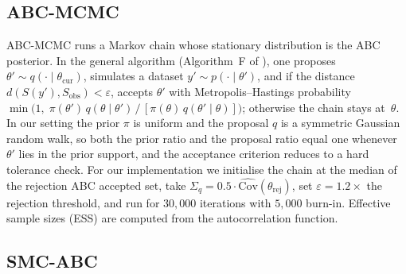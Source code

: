 \documentclass[11pt]{article}
\begin{document}
\subsection{ABC-MCMC}

ABC-MCMC \citep{marjoram2003markov} runs a Markov chain whose stationary distribution is the ABC posterior. In the general algorithm (Algorithm~F of \citeauthor{marjoram2003markov}), one proposes $\theta' \sim q(\cdot \mid \theta_{\text{cur}})$, simulates a dataset $y' \sim p(\cdot \mid \theta')$, and if the distance $d(S(y'), S_{\text{obs}}) < \varepsilon$, accepts $\theta'$ with Metropolis--Hastings probability $\min\bigl(1,\; \pi(\theta')\,q(\theta \mid \theta')\,/\,[\pi(\theta)\,q(\theta' \mid \theta)]\bigr)$; otherwise the chain stays at~$\theta$. In our setting the prior $\pi$ is uniform and the proposal $q$ is a symmetric Gaussian random walk, so both the prior ratio and the proposal ratio equal one whenever $\theta'$ lies in the prior support, and the acceptance criterion reduces to a hard tolerance check. For our implementation we initialise the chain at the median of the rejection ABC accepted set, take $\Sigma_q = 0.5 \cdot \widehat{\text{Cov}}(\theta_{\text{rej}})$, set $\varepsilon = 1.2 \times$ the rejection threshold, and run for $30{,}000$ iterations with $5{,}000$ burn-in. Effective sample sizes (ESS) are computed from the autocorrelation function.

\subsection{SMC-ABC}
\end{document}
